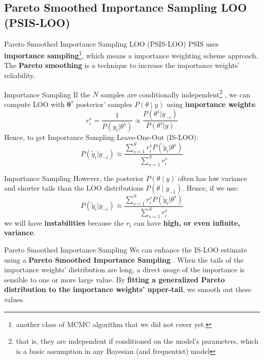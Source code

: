 \subsection{Pareto Smoothed Importance Sampling LOO (PSIS-LOO)}
\begin{frame}{Pareto Smoothed Importance Sampling LOO (PSIS-LOO)}
	PSIS uses \textbf{importance sampling}\footnote{another class of MCMC algorithm that we did not cover yet.},
	which means a importance weighting scheme approach.
	\vfill
	The \textbf{Pareto smoothing} is a technique to increase the importance weights' reliability.
\end{frame}

\begin{frame}{Importance Sampling}
	If the $N$ samples are conditionally independent\footnote{
		that is, they are independent if conditioned on the model's parameters,
		which is a basic assumption in any Bayesian (and frequentist) model}
	\parencite{gelfand1992model},
	we can compute LOO with $\boldsymbol{\theta}^s$ posterior' samples
	$P(\theta \mid y)$ using \textbf{importance weights}:
	$$
		r_i^s=\frac{1}{P(y_i|\theta^s)} \propto \frac{P(\theta^s|y_{-i})}{P(\theta^s|y)}
	$$
	Hence, to get Importance Sampling Leave-One-Out (IS-LOO):
	$$
		P(\tilde{y}_i|y_{-i})
		\approx
		\frac{\sum_{s=1}^S r_i^s P(\tilde{y}_i|\theta^s)}{\sum_{s=1}^S r_i^s}
	$$
\end{frame}

\begin{frame}{Importance Sampling}
	However, the posterior $P(\theta \mid y)$ often has low variance and shorter tails
	than the LOO distributions $P(\theta \mid y_{-1})$.
	Hence, if we use:
	$$
		P(\tilde{y}_i|y_{-i}) \approx \frac{\sum_{s=1}^S r_i^s P(\tilde{y}_i|\theta^s)}{\sum_{s=1}^S r_i^s}
	$$
	we will have \textbf{instabilities} because the $r_i$ can have \textbf{high, or even infinite, variance}.
\end{frame}

\begin{frame}{Pareto Smoothed Importance Sampling}
	We can enhance the IS-LOO estimate using a \textbf{Pareto Smoothed Importance Sampling}
	\parencite{vehtariPracticalBayesianModel2015}.
	\vfill
	When the tails of the importance weights' distribution are long,
	a direct usage of the importance is sensible to one or more large value.
	By \textbf{fitting a generalized Pareto distribution to the importance weights' upper-tail},
	we smooth out these values.
\end{frame}

